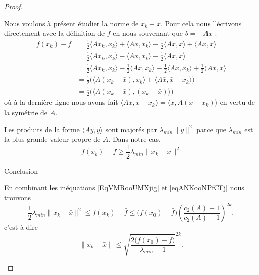 \begin{proof}
\begin{subproof}
            Nous voulons à présent étudier la norme de \( x_k-\bar x\). Pour cela nous l'écrivons directement avec la définition de \( f\) en nous souvenant que \( b=-A\bar x\) :
            \begin{subequations}
                \begin{align}
                    f(x_k)-\bar f&=\frac{ 1 }{2}\langle Ax_k, x_k\rangle +\langle A\bar x, x_k\rangle +\frac{ 1 }{2}\langle A\bar x, \bar x\rangle +\langle A\bar x, \bar x\rangle \\
                    &=\frac{ 1 }{2}\langle Ax_k, x_k\rangle -\langle A\bar x, x_k\rangle +\frac{ 1 }{2}\langle A\bar x, \bar x\rangle \\
                    &=\frac{ 1 }{2}\langle Ax_k, x_k\rangle -\frac{ 1 }{2}\langle A\bar x, x_k\rangle-\frac{ 1 }{2}\langle A\bar x, x_k\rangle +\frac{ 1 }{2}\langle A\bar x, \bar x\rangle \\
                    &=\frac{ 1 }{2}\Big( \langle A(x_k-\bar x), x_k\rangle +\langle A\bar x, \bar x-x_k\rangle  \Big)\\
                    &=\frac{ 1 }{2}\Big( \langle A(x_k-\bar x), (x_k-\bar x)\rangle  \Big)
                \end{align}
            \end{subequations}
            où à la dernière ligne nous avons fait \( \langle A\bar x, \bar x-x_k\rangle =\langle \bar x, A(\bar x-x_k)\rangle \) en vertu de la symétrie de \( A\).

            Les produits de la forme \( \langle Ay, y\rangle \) sont majorés par \( \lambda_{min}\| y \|^2\) parce que \( \lambda_{min}\) est la plus grande valeur propre de \( A\). Dans notre cas,
            \begin{equation}    \label{EqVMRooUMXjig}
                f(x_k)-\bar f\geq \frac{ 1 }{2}\lambda_{min}\| x_k-\bar x \|^2
            \end{equation}

        \item[Conclusion]

            En combinant les inéquations \eqref{EqVMRooUMXjig} et \eqref{eqANKooNPfCFj} nous trouvons
            \begin{equation}
                \frac{ 1 }{2}\lambda_{min}\| x_k-\bar x \|^2\leq f(x_k)-\bar f\leq \big( f(x_0)-\bar f \big)\left( \frac{ c_2(A)-1 }{ c_2(A)+1 } \right)^{2k},
            \end{equation}
            c'est-à-dire
            \begin{equation}
                \| x_k-\bar x \|\leq \sqrt{\frac{ 2\big( f(x_0)-\bar f \big) }{ \lambda_{min} +1}}^{2k}.
            \end{equation}
    \end{subproof}
\end{proof}

